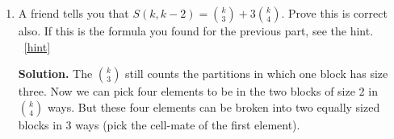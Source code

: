 \documentclass{book}
\begin{document}
\begin{activity}[]
\begin{enumerate}[font=\bfseries,label=(\alph*),ref=\alph*]
\item\label{task-261} \hypertarget{p-1478}{}%
A friend tells you that \(S(k,k-2) = \binom{k}{3} + 3 \binom{k}{4}\).  Prove this is correct also.  If this is the formula you found for the previous part, see the hint.%
~\hfill{\tiny\hyperlink{a-274.e}{[hint]}\hypertarget{q-274.e}{}}\par\smallskip%
\noindent\textbf{Solution.}\hypertarget{solution-219}{}\quad%
\hypertarget{p-1480}{}%
The \(\binom{k}{3}\) still counts the partitions in which one block has size three.  Now we can pick four elements to be in the two blocks of size 2 in \(\binom{k}{4}\) ways.  But these four elements can be broken into two equally sized blocks in 3 ways (pick the cell-mate of the first element).%
\end{enumerate}
\end{activity}
\end{document}
